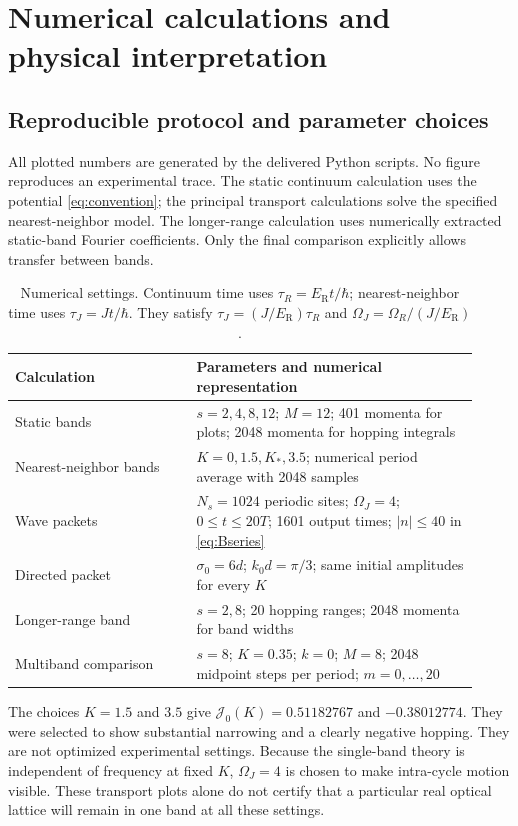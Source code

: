 \documentclass[11pt,oneside]{report}
\numberwithin{equation}{chapter}
\newcommand{\ER}{E_{\mathrm R}}
\begin{document}
\chapter{Numerical calculations and physical interpretation}
\section{Reproducible protocol and parameter choices}
All plotted numbers are generated by the delivered Python scripts. No figure reproduces an experimental trace. The static continuum calculation uses the potential \cref{eq:convention}; the principal transport calculations solve the specified nearest-neighbor model. The longer-range calculation uses numerically extracted static-band Fourier coefficients. Only the final comparison explicitly allows transfer between bands.

\begin{table}[!htbp]\centering\small
\begin{tabular}{P{0.36\linewidth}P{0.56\linewidth}}\toprule
Calculation&Parameters and numerical representation\\\midrule
Static bands&$s=2,4,8,12$; $M=12$; 401 momenta for plots; 2048 momenta for hopping integrals\\
Nearest-neighbor bands&$K=0,1.5,K_*,3.5$; numerical period average with 2048 samples\\
Wave packets&$N_s=1024$ periodic sites; $\Omega_J=4$; $0\leq t\leq20T$; 1601 output times; $|n|\leq40$ in \cref{eq:Bseries}\\
Directed packet&$\sigma_0=6d$; $k_0d=\pi/3$; same initial amplitudes for every $K$\\
Longer-range band&$s=2,8$; 20 hopping ranges; 2048 momenta for band widths\\
Multiband comparison&$s=8$; $K=0.35$; $k=0$; $M=8$; 2048 midpoint steps per period; $m=0,\ldots,20$\\\bottomrule
\end{tabular}\caption{Numerical settings. Continuum time uses $\tau_R=\ER t/\hbar$; nearest-neighbor time uses $\tau_J=Jt/\hbar$. They satisfy $\tau_J=(J/\ER)\tau_R$ and $\Omega_J=\Omega_R/(J/\ER)$.}\label{tab:protocol}\end{table}

The choices $K=1.5$ and $3.5$ give $\mathcal J_0(K)=0.51182767$ and $-0.38012774$. They were selected to show substantial narrowing and a clearly negative hopping. They are not optimized experimental settings. Because the single-band theory is independent of frequency at fixed $K$, $\Omega_J=4$ is chosen to make intra-cycle motion visible. These transport plots alone do not certify that a particular real optical lattice will remain in one band at all these settings.
\end{document}
